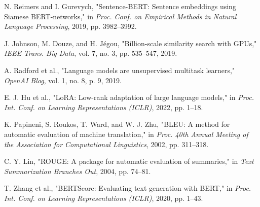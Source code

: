\documentclass[conference]{IEEEtran}
\begin{document}
\begin{thebibliography}{00}
 N. Reimers and I. Gurevych, "Sentence-BERT: Sentence embeddings using Siamese BERT-networks," in \emph{Proc. Conf. on Empirical Methods in Natural Language Processing}, 2019, pp. 3982--3992.

 J. Johnson, M. Douze, and H. Jégou, "Billion-scale similarity search with GPUs," \emph{IEEE Trans. Big Data}, vol. 7, no. 3, pp. 535--547, 2019.

 A. Radford et al., "Language models are unsupervised multitask learners," \emph{OpenAI Blog}, vol. 1, no. 8, p. 9, 2019.

 E. J. Hu et al., "LoRA: Low-rank adaptation of large language models," in \emph{Proc. Int. Conf. on Learning Representations (ICLR)}, 2022, pp. 1--18.

 K. Papineni, S. Roukos, T. Ward, and W. J. Zhu, "BLEU: A method for automatic evaluation of machine translation," in \emph{Proc. 40th Annual Meeting of the Association for Computational Linguistics}, 2002, pp. 311--318.

 C. Y. Lin, "ROUGE: A package for automatic evaluation of summaries," in \emph{Text Summarization Branches Out}, 2004, pp. 74--81.

 T. Zhang et al., "BERTScore: Evaluating text generation with BERT," in \emph{Proc. Int. Conf. on Learning Representations (ICLR)}, 2020, pp. 1--43.

\end{thebibliography}
\end{document}
